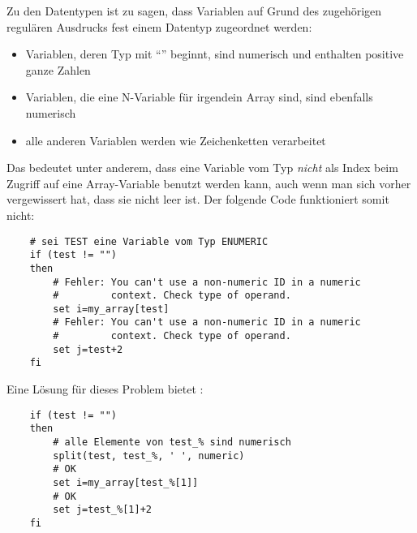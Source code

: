 
    Zu den Datentypen ist zu sagen, dass Variablen auf Grund des zugehörigen
    regulären Ausdrucks fest einem Datentyp zugeordnet werden:

\begin{itemize}
\item Variablen, deren Typ mit "`"' beginnt, sind numerisch und
      enthalten positive ganze Zahlen
\item Variablen, die eine N-Variable für irgendein Array sind, sind ebenfalls
      numerisch
\item alle anderen Variablen werden wie Zeichenketten verarbeitet
\end{itemize}

    Das bedeutet unter anderem, dass eine Variable vom Typ 
    \emph{nicht} als Index beim Zugriff auf eine Array-Variable benutzt werden
    kann, auch wenn man sich vorher vergewissert hat, dass sie nicht leer ist.
    Der folgende Code funktioniert somit nicht:
\begin{example}
\begin{verbatim}
    # sei TEST eine Variable vom Typ ENUMERIC
    if (test != "")
    then
        # Fehler: You can't use a non-numeric ID in a numeric 
        #         context. Check type of operand.
        set i=my_array[test]
        # Fehler: You can't use a non-numeric ID in a numeric 
        #         context. Check type of operand.
        set j=test+2
    fi
\end{verbatim}
\end{example}

    Eine Lösung für dieses Problem bietet :
\begin{example}
\begin{verbatim}
    if (test != "")
    then
        # alle Elemente von test_% sind numerisch
        split(test, test_%, ' ', numeric)
        # OK
        set i=my_array[test_%[1]]
        # OK
        set j=test_%[1]+2
    fi
\end{verbatim}
\end{example}


